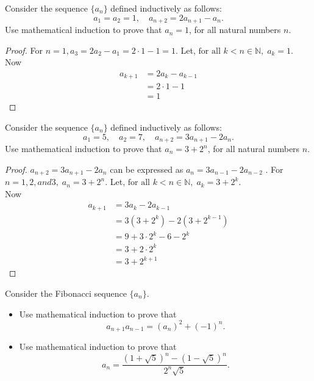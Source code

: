 \documentclass[12pt]{article}
\newenvironment{problem}[2][Problem]{\begin{trivlist}
\item[\hskip \labelsep {\bfseries #1}\hskip \labelsep {\bfseries #2.}]}{\end{trivlist}}
\begin{document}
\begin{problem}{11}
Consider the sequence \( \{a_n\} \) defined inductively as follows:
\[
	a_1 = a_2 = 1, \quad a_{n+2} = 2a_{n+1} - a_n.
\]
Use mathematical induction to prove that \( a_n = 1 \), for all natural numbers \( n \).

\end{problem}

\begin{proof}
	For $n = 1, a_3 = 2a_2 - a_1 = 2\cdot 1 - 1 = 1$. Let, $\text{for all } k < n \in \mathbb{N}, \; a_k = 1$.\\
	Now
	\begin{align*}
		a_{k+1} & = 2a_k - a_{k-1} \\
		        & = 2\cdot 1 - 1   \\
		        & = 1
	\end{align*}

\end{proof}

\begin{problem}{12}
Consider the sequence \( \{a_n\} \) defined inductively as follows:
\[
	a_1 = 5, \quad a_2 = 7, \quad a_{n+2} = 3a_{n+1} - 2a_n.
\]
Use mathematical induction to prove that \( a_n = 3 + 2^n \), for all natural numbers \( n \).

\end{problem}

\begin{proof}
	$a_{n+2} = 3a_{n+1} - 2a_n$ can be expressed as $a_n = 3a_{n-1} - 2a_{n-2}$ .
	For $n = 1, 2, and 3, \; a_n = 3 + 2^n$. Let, $\text{for all } k < n \in \mathbb{N}, \; a_k = 3 + 2^k$. \\
	Now
	\begin{align*}
		a_{k+1} & = 3a_k - 2a_{k-1}          \\
		        & = 3(3+2^k) - 2(3+2^{k-1})  \\
		        & = 9 + 3\cdot 2^k - 6 - 2^k \\
		        & = 3 + 2\cdot 2^k           \\
		        & = 3 + 2^{k+1}
	\end{align*}

\end{proof}

\begin{problem}{13}
Consider the Fibonacci sequence \( \{a_n\} \).

\begin{itemize}
	\item[(a)] Use mathematical induction to prove that
	      \[
		      a_{n+1} a_{n-1} = (a_n)^2 + (-1)^n.
	      \]

	\item[(b)] Use mathematical induction to prove that
	      \[
		      a_n = \frac{(1 + \sqrt{5})^n - (1 - \sqrt{5})^n}{2^n \sqrt{5}}.
	      \]
\end{itemize}

\end{problem}
\end{document}
